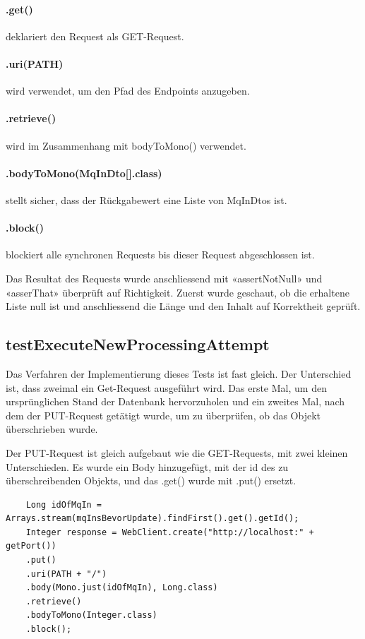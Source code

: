\paragraph{.get()} deklariert den Request als GET-Request.
\paragraph{.uri(PATH)} wird verwendet, um den Pfad des Endpoints anzugeben.
\paragraph{.retrieve()} wird im Zusammenhang mit bodyToMono() verwendet.
\paragraph{.bodyToMono(MqInDto[].class)} stellt sicher, dass der Rückgabewert eine Liste von MqInDtos ist.
\paragraph{.block()} blockiert alle synchronen Requests bis dieser Request abgeschlossen ist.

Das Resultat des Requests wurde anschliessend mit «assertNotNull» und «asserThat» überprüft auf Richtigkeit. Zuerst wurde geschaut, ob die erhaltene Liste null ist und anschliessend die Länge und den Inhalt auf Korrektheit geprüft.

\subsection{testExecuteNewProcessingAttempt}
Das Verfahren der Implementierung dieses Tests ist fast gleich. Der Unterschied ist, dass zweimal ein Get-Request ausgeführt wird. Das erste Mal, um den ursprünglichen Stand der Datenbank hervorzuholen und ein zweites Mal, nach dem der PUT-Request getätigt wurde, um zu überprüfen, ob das Objekt überschrieben wurde. 

Der PUT-Request ist gleich aufgebaut wie die GET-Requests, mit zwei kleinen Unterschieden. Es wurde ein Body hinzugefügt, mit der id des zu überschreibenden Objekts, und das .get() wurde mit .put() ersetzt. 

\begin{verbatim}
	Long idOfMqIn = Arrays.stream(mqInsBevorUpdate).findFirst().get().getId();
	Integer response = WebClient.create("http://localhost:" + getPort())
	.put()
	.uri(PATH + "/")
	.body(Mono.just(idOfMqIn), Long.class)
	.retrieve()
	.bodyToMono(Integer.class)
	.block();
\end{verbatim}

